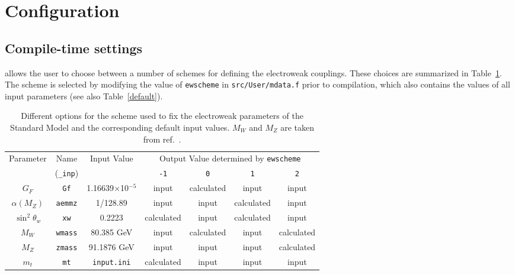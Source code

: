 \section{Configuration}
\label{Input_parameters}

\subsection{Compile-time settings}
\MCFM{} allows the user to choose between a number of schemes
for defining the electroweak couplings. These choices are summarized
in Table~\ref{ewscheme}. The scheme is selected by modifying the
value of {\tt ewscheme} in {\tt src/User/mdata.f} prior to compilation, 
which also contains
the values of all input parameters (see also Table~\ref{default}).

\begin{table}
\begin{center}
	\caption{Different options for the scheme used to fix the electroweak
		parameters of the Standard Model and the corresponding default input
		values. $M_W$ and $M_Z$ are taken from ref.~\cite{Amsler:2008zzb}.}
	\label{ewscheme}
	\vspace{0.5em}
\begin{tabular}{|c|c|c|c|c|c|c|} \hline
 Parameter & Name & Input Value
 & \multicolumn{4}{c|}{Output Value determined by \tt ewscheme} \\
\cline{4-7}
& ({\tt \_inp}) & & {\tt -1} & {\tt 0} & {\tt 1} & {\tt 2} \\ \hline
$G_F$            & {\tt Gf}      & 1.16639$\times$10$^{-5}$ 
 & input & calculated & input & input \\
$\alpha(M_Z)$    & {\tt aemmz}   & 1/128.89                 
 & input & input & calculated & input \\
$\sin^2 \theta_w$& {\tt xw}      & 0.2223               
 & calculated & input & calculated & input \\
$M_W$            & {\tt wmass}   & 80.385 GeV                
 & input & calculated & input & calculated \\
$M_Z$            & {\tt zmass}   & 91.1876 GeV               
 & input & input & input & calculated \\
$m_t$            & {\tt mt}      & {\tt input.ini}                  
 & calculated & input & input & input \\
\hline
\end{tabular}
\end{center}
\end{table}

